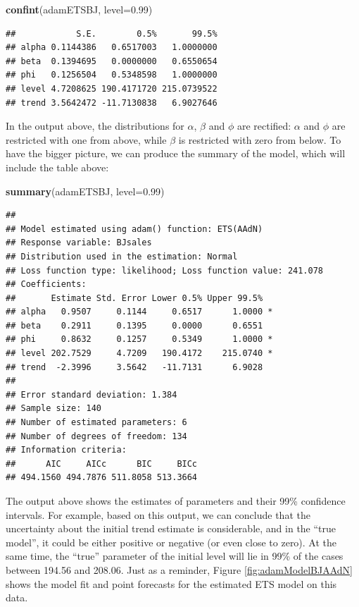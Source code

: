 \documentclass[]{book}
\newenvironment{Shaded}{\begin{snugshade}}{\end{snugshade}}
\newcommand{\DataTypeTok}[1]{\textcolor[rgb]{0.13,0.29,0.53}{#1}}
\newcommand{\FloatTok}[1]{\textcolor[rgb]{0.00,0.00,0.81}{#1}}
\newcommand{\KeywordTok}[1]{\textcolor[rgb]{0.13,0.29,0.53}{\textbf{#1}}}
\newcommand{\NormalTok}[1]{#1}
\theoremstyle{definition}
\theoremstyle{definition}
\theoremstyle{definition}
\theoremstyle{definition}
\theoremstyle{remark}
\begin{document}
\begin{Shaded}
\begin{Highlighting}[]
\KeywordTok{confint}\NormalTok{(adamETSBJ, }\DataTypeTok{level=}\FloatTok{0.99}\NormalTok{)}
\end{Highlighting}
\end{Shaded}

\begin{verbatim}
##            S.E.        0.5%       99.5%
## alpha 0.1144386   0.6517003   1.0000000
## beta  0.1394695   0.0000000   0.6550654
## phi   0.1256504   0.5348598   1.0000000
## level 4.7208625 190.4171720 215.0739522
## trend 3.5642472 -11.7130838   6.9027646
\end{verbatim}

In the output above, the distributions for \(\alpha\), \(\beta\) and \(\phi\) are rectified: \(\alpha\) and \(\phi\) are restricted with one from above, while \(\beta\) is restricted with zero from below. To have the bigger picture, we can produce the summary of the model, which will include the table above:

\begin{Shaded}
\begin{Highlighting}[]
\KeywordTok{summary}\NormalTok{(adamETSBJ, }\DataTypeTok{level=}\FloatTok{0.99}\NormalTok{)}
\end{Highlighting}
\end{Shaded}

\begin{verbatim}
## 
## Model estimated using adam() function: ETS(AAdN)
## Response variable: BJsales
## Distribution used in the estimation: Normal
## Loss function type: likelihood; Loss function value: 241.078
## Coefficients:
##       Estimate Std. Error Lower 0.5% Upper 99.5%  
## alpha   0.9507     0.1144     0.6517      1.0000 *
## beta    0.2911     0.1395     0.0000      0.6551  
## phi     0.8632     0.1257     0.5349      1.0000 *
## level 202.7529     4.7209   190.4172    215.0740 *
## trend  -2.3996     3.5642   -11.7131      6.9028  
## 
## Error standard deviation: 1.384
## Sample size: 140
## Number of estimated parameters: 6
## Number of degrees of freedom: 134
## Information criteria:
##      AIC     AICc      BIC     BICc 
## 494.1560 494.7876 511.8058 513.3664
\end{verbatim}

The output above shows the estimates of parameters and their 99\% confidence intervals. For example, based on this output, we can conclude that the uncertainty about the initial trend estimate is considerable, and in the ``true model'', it could be either positive or negative (or even close to zero). At the same time, the ``true'' parameter of the initial level will lie in 99\% of the cases between 194.56 and 208.06. Just as a reminder, Figure \ref{fig:adamModelBJAAdN} shows the model fit and point forecasts for the estimated ETS model on this data.
\end{document}
